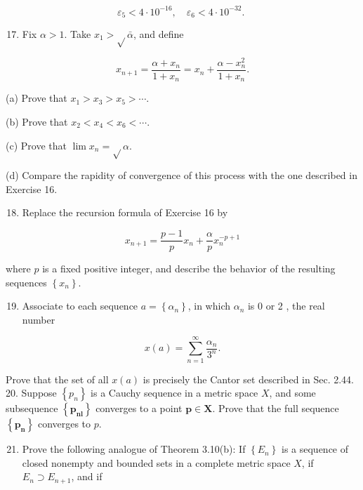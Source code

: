 \documentclass[10pt]{article}
\begin{document}
$$
\varepsilon_{5}<4 \cdot 10^{-16}, \quad \varepsilon_{6}<4 \cdot 10^{-32} \text {. }
$$

\begin{enumerate}
  \setcounter{enumi}{16}
  \item Fix $\alpha>1$. Take $x_{1}>\sqrt{ } \bar{\alpha}$, and define
\end{enumerate}

$$
x_{n+1}=\frac{\alpha+x_{n}}{1+x_{n}}=x_{n}+\frac{\alpha-x_{n}^{2}}{1+x_{n}} .
$$

(a) Prove that $x_{1}>x_{3}>x_{5}>\cdots$.

(b) Prove that $x_{2}<x_{4}<x_{6}<\cdots$.

(c) Prove that $\lim x_{n}=\sqrt{ } \alpha$.

(d) Compare the rapidity of convergence of this process with the one described in Exercise 16.

\begin{enumerate}
  \setcounter{enumi}{17}
  \item Replace the recursion formula of Exercise 16 by
\end{enumerate}

$$
x_{n+1}=\frac{p-1}{p} x_{n}+\frac{\alpha}{p} x_{n}^{-p+1}
$$

where $p$ is a fixed positive integer, and describe the behavior of the resulting sequences $\left\{x_{n}\right\}$.

\begin{enumerate}
  \setcounter{enumi}{18}
  \item Associate to each sequence $a=\left\{\alpha_{n}\right\}$, in which $\alpha_{n}$ is 0 or 2 , the real number
\end{enumerate}

$$
x(a)=\sum_{n=1}^{\infty} \frac{\alpha_{n}}{3^{n}} .
$$

Prove that the set of all $x(a)$ is precisely the Cantor set described in Sec. 2.44. 20. Suppose $\left\{p_{n}\right\}$ is a Cauchy sequence in a metric space $X$, and some subsequence $\left\{\boldsymbol{p}_{\boldsymbol{n} \boldsymbol{l}}\right\}$ converges to a point $\boldsymbol{p} \in \boldsymbol{X}$. Prove that the full sequence $\left\{\boldsymbol{p}_{\boldsymbol{n}}\right\}$ converges to $p$.

\begin{enumerate}
  \setcounter{enumi}{20}
  \item Prove the following analogue of Theorem 3.10(b): If $\left\{E_{n}\right\}$ is a sequence of closed nonempty and bounded sets in a complete metric space $X$, if $E_{n} \supset E_{n+1}$, and if
\end{enumerate}
\end{document}
